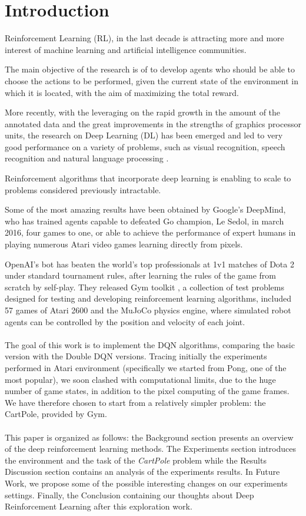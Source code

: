 \section{Introduction}

Reinforcement Learning (RL), in the last decade is attracting more and more interest of machine learning and artificial intelligence communities.

The main objective of the research is of to develop agents who should be able to choose the actions to be performed, given the current state of the environment in which it is located, with the aim of maximizing the total reward.

More recently, with the leveraging on the rapid growth in the amount of the annotated data and the great improvements in the strengths of graphics processor units, the research on  Deep Learning (DL) has been emerged and led to very good performance on a variety of problems, such as visual recognition, speech recognition and natural language processing \cite{AdvancesCNN}.

Reinforcement algorithms that incorporate deep learning is enabling to scale to problems considered previously intractable.

Some of the most amazing results have been obtained by Google’s DeepMind, who has trained agents capable to defeated Go champion, Le Sedol, in march 2016, four games to one, or able to achieve the performance of expert humans in playing numerous Atari video games learning directly from pixels.

OpenAI's bot has beaten the world's top professionals at 1v1 matches of Dota 2 under standard tournament rules, after learning the rules of the game from scratch by self-play.
They released Gym toolkit \cite{Gym}, a collection of test problems designed for testing and developing reinforcement learning algorithms, included 57 games of Atari 2600 and the MuJoCo physics engine, where simulated robot agents can be controlled by the position and velocity of each joint. 
\\\\
The goal of this work is to implement the DQN algorithms, comparing the basic version with the Double DQN versions. Tracing initially the experiments performed in Atari environment (specifically we started from Pong, one of the most popular), we soon clashed with computational limits, due to the huge number of game states, in addition to the pixel computing of the game frames. We have therefore chosen to start from a relatively simpler problem: the CartPole, provided by Gym.
\\\\
This paper is organized as follows: the Background section presents an overview of the deep reinforcement learning methods. The Experiments section introduces the environment and the task of the \textit{CartPole} problem while the Results Discussion section contains an analysis of the experiments results. In Future Work, we propose some of the possible interesting changes on our experiments settings. Finally, the Conclusion containing our thoughts about Deep Reinforcement Learning after this exploration work.
